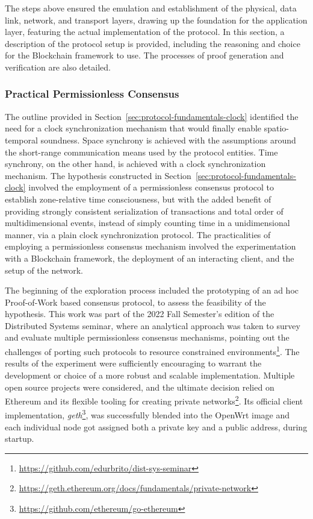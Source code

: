 The steps above ensured the emulation and establishment of the physical, data link, network, and transport layers, drawing up the foundation for the application layer, featuring the actual implementation of the \pol{} protocol. In this section, a description of the protocol setup is provided, including the reasoning and choice for the Blockchain framework to use. The processes of proof generation and verification are also detailed.

\subsubsection{Practical Permissionless Consensus} \label{sec:pol-implementation:practical-permissionless-consensus}

The outline provided in Section~\ref{sec:protocol-fundamentals-clock} identified the need for a clock synchronization mechanism that would finally enable spatio-temporal soundness. Space synchrony is achieved with the assumptions around the short-range communication means used by the protocol entities. Time synchrony, on the other hand, is achieved with a clock synchronization mechanism. The hypothesis constructed in Section~\ref{sec:protocol-fundamentals-clock} involved the employment of a permissionless consensus protocol to establish zone-relative time consciousness, but with the added benefit of providing strongly consistent serialization of transactions and total order of multidimensional events, instead of simply counting time in a unidimensional manner, via a plain clock synchronization protocol. The practicalities of employing a permissionless consensus mechanism involved the experimentation with a Blockchain framework, the deployment of an interacting client, and the setup of the network.

The beginning of the exploration process included the prototyping of an ad hoc Proof-of-Work based consensus protocol, to assess the feasibility of the hypothesis. This work was part of the 2022 Fall Semester's edition of the Distributed Systems seminar, where an analytical approach was taken to survey and evaluate multiple permissionless consensus mechanisms, pointing out the challenges of porting such protocols to resource constrained environments\footnote{\url{https://github.com/edurbrito/dist-sys-seminar}}. The results of the experiment were sufficiently encouraging to warrant the development or choice of a more robust and scalable implementation. Multiple open source projects were considered, and the ultimate decision relied on Ethereum and its flexible tooling for creating private networks\footnote{\url{https://geth.ethereum.org/docs/fundamentals/private-network}}. Its official client implementation, \emph{geth}\footnote{\url{https://github.com/ethereum/go-ethereum}}, was successfully blended into the OpenWrt image and each individual node got assigned both a private key and a public address, during startup.


